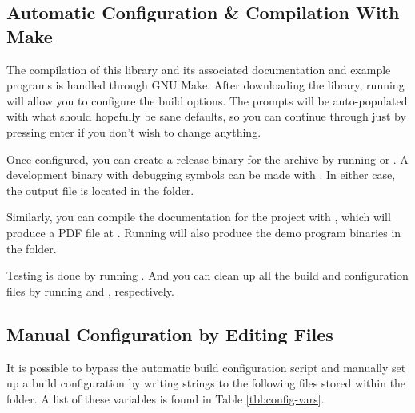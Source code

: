 \subsection{Automatic Configuration \& Compilation With Make}

The compilation of this library and its associated documentation and example programs is handled through GNU Make. After downloading the library, running  will allow you to configure the build options. The prompts will be auto-populated with what should hopefully be sane defaults, so you can continue through just by pressing enter if you don't wish to change anything.

Once configured, you can create a release binary for the archive by running  or . A development binary with debugging symbols can be made with . In either case, the output file is located in the  folder.

Similarly, you can compile the documentation for the project with , which will produce a PDF file at . Running  will also produce the demo program binaries in the  folder.

Testing is done by running . And you can clean up all the build and configuration files by running  and , respectively.

\subsection{Manual Configuration by Editing Files}

It is possible to bypass the automatic build configuration script and manually set up a build configuration by writing strings to the following files stored within the  folder. A list of these variables is found in Table \ref{tbl:config-vars}.

